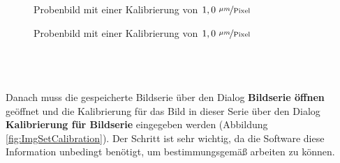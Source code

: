 \documentclass[
fontsize=10pt, 
listof = totoc,
parskip = half	
]{report}
\begin{document}
\begin{minipage}{1.0\linewidth}
	\begin{minipage}[t]{0.3\linewidth}\vspace{0pt}
		\begin{figure}[H]
			\caption{Probenbild mit einer Kalibrierung von $1,0~\nicefrac{\mu m}{\text{Pixel}}$}
			\label{fig:ImgPicBar}
		\end{figure}
	\end{minipage}
	\begin{minipage}[t]{0.69\linewidth}\vspace{0pt}
		\begin{figure}[H]
			\centering
			\caption{Probenbild mit einer Kalibrierung von $1,0~\nicefrac{\mu m}{\text{Pixel}}$}
			\label{fig:ImgSetSave}
		\end{figure}
	\end{minipage}
\end{minipage}
\\\\\\
\noindent Danach muss die gespeicherte Bildserie über den Dialog \textbf{\glqq Bildserie öffnen\grqq} geöffnet und die Kalibrierung für das Bild in dieser Serie über den Dialog \textbf{\glqq Kalibrierung für Bildserie \grqq} eingegeben werden (Abbildung \ref{fig:ImgSetCalibration}). Der Schritt ist sehr wichtig, da die Software diese Information unbedingt benötigt, um bestimmungsgemäß arbeiten zu können. 
\end{document}
